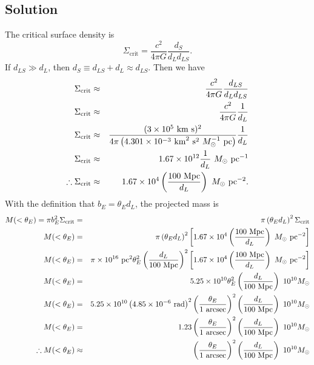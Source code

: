 \documentclass[]{article}
\begin{document}
\subsection{Solution}
The critical surface density is
\begin{equation}
\Sigma_{\mathrm{crit}} = \frac{c^2}{4\pi G} \frac{d_S}{d_L d_{LS}}.
\end{equation}
\noindent
If $d_{LS}\gg d_L$, then $d_S \equiv d_{LS} + d_L \approx d_{LS}$.
Then we have
\begin{eqnarray}
\Sigma_{\mathrm{crit}} &\approx& \frac{c^2}{4\pi G} \frac{d_{LS}}{d_L d_{LS}}\\
\Sigma_{\mathrm{crit}} &\approx& \frac{c^2}{4\pi G} \frac{1}{d_L}\\
\Sigma_{\mathrm{crit}} &\approx& \frac{(3\times10^5~\mathrm{km}~\mathrm{s})^2}{4\pi \left(4.301\times10^{-3}~\mathrm{km}^2~\mathrm{s}^2~M_{\odot}^{-1}~\mathrm{pc}\right)} \frac{1}{d_L}\\
\Sigma_{\mathrm{crit}} &\approx& 1.67\times10^{12}\frac{1}{d_L}~M_{\odot}~\mathrm{pc}^{-1}\\
\therefore \Sigma_{\mathrm{crit}} &\approx& 1.67\times10^{4}\left(\frac{100~\mathrm{Mpc}}{d_L}\right)~M_{\odot}~\mathrm{pc}^{-2}.
\end{eqnarray}
\noindent
With the definition that $b_E = \theta_E d_L$, the projected mass is
\begin{eqnarray}
M(<\theta_E) = \pi b_E^2 \Sigma_{\mathrm{crit}}&=& \pi \left(\theta_E d_L\right)^2 \Sigma_{\mathrm{crit}}\\
M(<\theta_E) &=& \pi \left(\theta_E d_L\right)^2 \left[ 1.67\times10^{4}\left(\frac{100~\mathrm{Mpc}}{d_L}\right)~M_{\odot}~\mathrm{pc}^{-2}\right]\\
M(<\theta_E) &=& \pi\times10^{16}~\mathrm{pc}^2 \theta_E^2 \left(\frac{d_L}{100~\mathrm{Mpc}}\right)^2 \left[ 1.67\times10^{4}\left(\frac{100~\mathrm{Mpc}}{d_L}\right)~M_{\odot}~\mathrm{pc}^{-2}\right]\\
M(<\theta_E) &=& 5.25\times10^{10} \theta_E^2 \left(\frac{d_L}{100~\mathrm{Mpc}}\right)~10^{10}M_{\odot}\\
M(<\theta_E) &=& 5.25\times10^{10} \left(4.85\times10^{-6}~\mathrm{rad}\right)^2 \left(\frac{\theta_E}{1~\mathrm{arcsec}}\right)^2 \left(\frac{d_L}{100~\mathrm{Mpc}}\right)~10^{10}M_{\odot}\\
M(<\theta_E) &=& 1.23 \left(\frac{\theta_E}{1~\mathrm{arcsec}}\right)^2 \left(\frac{d_L}{100~\mathrm{Mpc}}\right)~10^{10}M_{\odot}\\
\therefore M(<\theta_E) &\approx&  \left(\frac{\theta_E}{1~\mathrm{arcsec}}\right)^2 \left(\frac{d_L}{100~\mathrm{Mpc}}\right)~10^{10}M_{\odot}\\
\end{eqnarray}
\end{document}
